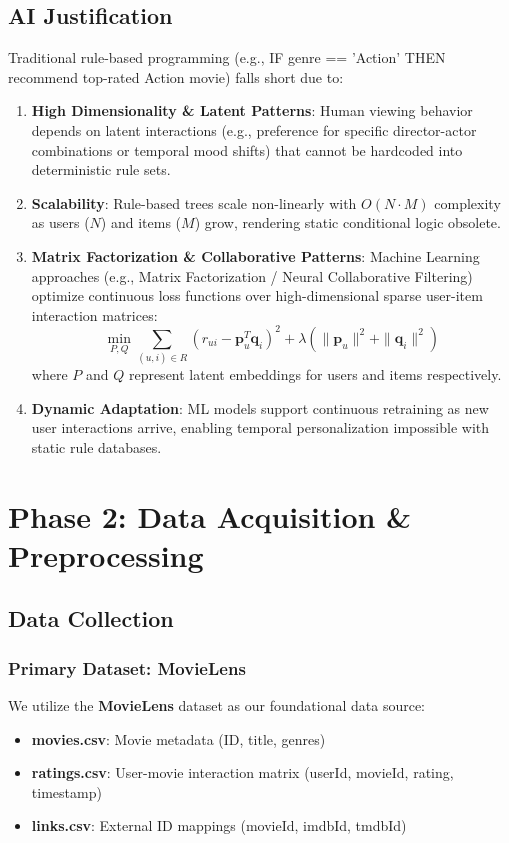 \documentclass[11pt,a4paper]{article}
\begin{document}
\subsection{AI Justification}
Traditional rule-based programming (e.g., IF genre == 'Action' THEN recommend top-rated Action movie) falls short due to:
\begin{enumerate}
    \item \textbf{High Dimensionality \& Latent Patterns}: Human viewing behavior depends on latent interactions (e.g., preference for specific director-actor combinations or temporal mood shifts) that cannot be hardcoded into deterministic rule sets.
    \item \textbf{Scalability}: Rule-based trees scale non-linearly with $O(N \cdot M)$ complexity as users ($N$) and items ($M$) grow, rendering static conditional logic obsolete.
    \item \textbf{Matrix Factorization \& Collaborative Patterns}: Machine Learning approaches (e.g., Matrix Factorization / Neural Collaborative Filtering) optimize continuous loss functions over high-dimensional sparse user-item interaction matrices:
    \begin{equation}
        \min_{P, Q} \sum_{(u,i) \in R} \left( r_{ui} - \mathbf{p}_u^T \mathbf{q}_i \right)^2 + \lambda \left( \|\mathbf{p}_u\|^2 + \|\mathbf{q}_i\|^2 \right)
    \end{equation}
    where $P$ and $Q$ represent latent embeddings for users and items respectively.
    \item \textbf{Dynamic Adaptation}: ML models support continuous retraining as new user interactions arrive, enabling temporal personalization impossible with static rule databases.
\end{enumerate}

\section{Phase 2: Data Acquisition \& Preprocessing}

\subsection{Data Collection}

\subsubsection{Primary Dataset: MovieLens}
We utilize the \textbf{MovieLens} dataset as our foundational data source:
\begin{itemize}
    \item \textbf{movies.csv}: Movie metadata (ID, title, genres)
    \item \textbf{ratings.csv}: User-movie interaction matrix (userId, movieId, rating, timestamp)
    \item \textbf{links.csv}: External ID mappings (movieId, imdbId, tmdbId)
\end{itemize}
\end{document}
